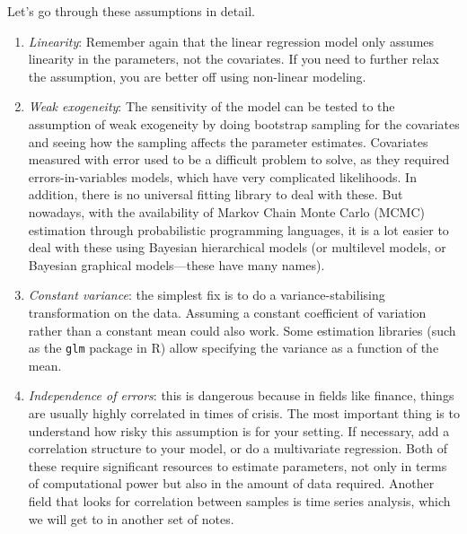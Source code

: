 Let's go through these assumptions in detail.  
\begin{enumerate}
  \item \textit{Linearity}: Remember again that the linear regression model only assumes linearity in the parameters, not the covariates. If you need to further relax the assumption, you are better off using non-linear modeling. 

  \item \textit{Weak exogeneity}: The sensitivity of the model can be tested to the assumption of weak exogeneity by doing bootstrap sampling for the covariates and seeing how the sampling affects the parameter estimates. Covariates measured with error used to be a difficult problem to solve, as they required errors-in-variables models, which have very complicated likelihoods. In addition, there is no universal fitting library to deal with these. But nowadays, with the availability of Markov Chain Monte Carlo (MCMC) estimation through probabilistic programming languages, it is a lot easier to deal with these using Bayesian hierarchical models (or multilevel models, or Bayesian graphical models---these have many names).

  \item \textit{Constant variance}: the simplest fix is to do a variance-stabilising transformation on the data. Assuming a constant coefficient of variation rather than a constant mean could also work. Some estimation libraries (such as the \verb+glm+ package in R) allow specifying the variance as a function of the mean.

  \item \textit{Independence of errors}: this is dangerous because in fields like finance, things are usually highly correlated in times of crisis. The most important thing is to understand how risky this assumption is for your setting. If necessary, add a correlation structure to your model, or do  a multivariate regression. Both of these require significant resources to estimate parameters, not only in terms of computational power but also in the amount of data required. Another field that looks for correlation between samples is time series analysis, which we will get to in another set of notes. 


\end{enumerate}
